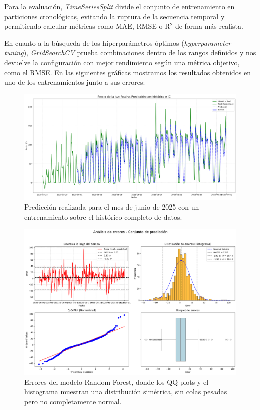 Para la evaluación, \textit{TimeSeriesSplit} divide el conjunto de entrenamiento en particiones cronológicas, evitando la ruptura de la secuencia temporal y permitiendo calcular métricas como MAE, RMSE o R$^2$ de forma más realista.

En cuanto a la búsqueda de los hiperparámetros óptimos (\textit{hyperparameter tuning}), \textit{GridSearchCV} prueba combinaciones dentro de los rangos definidos y nos devuelve la configuración con mejor rendimiento según una métrica objetivo, como el RMSE. En las siguientes gráficas mostramos los resultados obtenidos en uno de los entrenamientos junto a sus errores:
\begin{figure}[H]
    \centering
    \includegraphics[width=0.7\linewidth]{figuras/RandomForest_prediccion.png}
    \caption[Prediccion con Random Forest]{Predicción realizada para el mes de junio de 2025 con un entrenamiento sobre el histórico completo de datos.}
    \label{RandomForest_prediccion}
\end{figure}

\begin{figure}[H]
    \centering
    \includegraphics[width=0.7\linewidth]{figuras/RandomForest_errorespng.png}
    \caption[Errores en prediccion con Random Forest]{Errores del modelo Random Forest, donde los QQ-plots y el histograma muestran una distribución simétrica, sin colas pesadas pero no completamente normal.}
    \label{RandomForest_errores}
\end{figure}
%
%
%
